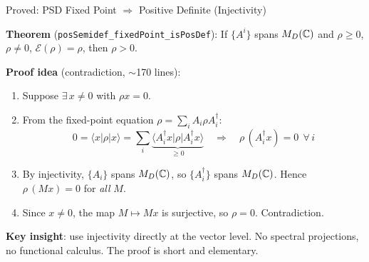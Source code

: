 \documentclass[aspectratio=169,10pt]{beamer}
\begin{document}
\begin{frame}{Proved: PSD Fixed Point $\Rightarrow$ Positive Definite (Injectivity)}
    \vspace{-0.3em}

    \textbf{Theorem} (\texttt{posSemidef\_fixedPoint\_isPosDef}):
    If $\{A^i\}$ spans $M_D(\mathbb{C})$ and $\rho \geq 0$, $\rho \neq 0$,
    $\mathcal{E}(\rho) = \rho$, then $\rho > 0$.

    \vspace{0.3em}
    \textbf{Proof idea} (contradiction, $\sim$170 lines):
    \begin{enumerate}\itemsep0.2em
        \item {\small Suppose $\exists\, x \neq 0$ with $\rho x = 0$.}
        \item {\small From the fixed-point equation $\rho = \sum_i A_i \rho A_i^\dagger$:
            \[
                0 = \langle x | \rho | x\rangle = \sum_i \underbrace{\langle A_i^\dagger x | \rho | A_i^\dagger x\rangle}_{\geq 0}
                    \quad\Longrightarrow\quad \rho\, (A_i^\dagger x) = 0\ \ \forall\, i
            \]}
        \item {\small By injectivity, $\{A_i\}$ spans $M_D(\mathbb{C})$, so $\{A_i^\dagger\}$ spans $M_D(\mathbb{C})$.
            Hence $\rho\, (M x) = 0$ for \emph{all} $M$.}
        \item {\small Since $x \neq 0$, the map $M \mapsto Mx$ is surjective,
            so $\rho = 0$. Contradiction.}
    \end{enumerate}

    \vspace{0.2em}
    {\small \textbf{Key insight}: use injectivity directly at the vector level.
    No spectral projections, no functional calculus. The proof is short and elementary.}
\end{frame}
\end{document}
